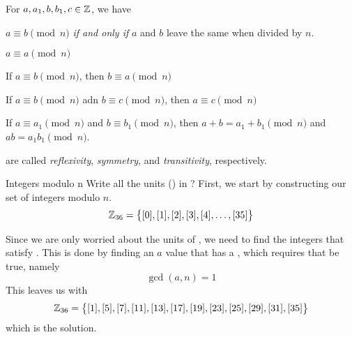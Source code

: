 \begin{theorem}
  For $a, a_{1}, b, b_{1}, c\in \operatorname{\mathbb{Z}}$, we have
  \begin{propertylist}
  \item $a \equiv b \pmod{n}$ \emph{if and only if} $a$ and $b$ leave the same  when divided by $n$.
  \item $a \equiv a \pmod{n}$ \label{prop:A_Congruent_B_Reflexivity}
  \item If $a \equiv b \pmod{n}$, then $b \equiv a \pmod{n}$ \label{prop:A_Congruent_B_Symmetry}
  \item If $a \equiv b \pmod{n}$ adn $b \equiv c \pmod{n}$, then $a \equiv c \pmod{n}$ \label{prop:A_Congruent_B_Transitivity}
  \item If $a \equiv a_{1} \pmod{n}$ and $b \equiv b_{1} \pmod{n}$, then $a+b = a_{1} + b_{1} \pmod{n}$ and $ab = a_{1}b_{1} \pmod{n}$.
  \end{propertylist}

   are called \emph{reflexivity}, \emph{symmetry}, and \emph{transitivity}, respectively.
\end{theorem}

\begin{example}{Integers modulo n}
  Write all the units () in ?
  \tcblower{}
  First, we start by constructing our set of integers modulo $n$.
  \begin{equation*}
    \operatorname{\mathbb{Z}}_{36} = \bigl\lbrace [0], [1], [2], [3], [4], \ldots, [35] \bigr\rbrace
  \end{equation*}

  Since we are only worried about the units of , we need to find the integers that satisfy .
  This is done by finding an $a$ value that has a , which requires that  be true, namely
  \begin{equation*}
    \gcd(a, n) = 1
  \end{equation*}
  This leaves us with
  \begin{equation*}
    \operatorname{\mathbb{Z}}_{36} = \bigl\lbrace [1], [5], [7], [11], [13], [17], [19], [23], [25], [29], [31], [35] \bigr\rbrace
  \end{equation*}
  which is the solution.
\end{example}


